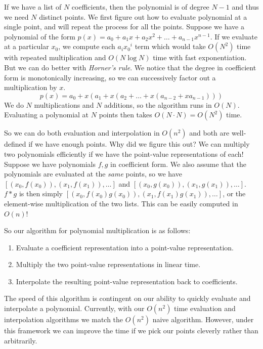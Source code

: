 \documentclass[11pt, oneside]{article}
\theoremstyle{plain}
\theoremstyle{definition}
\begin{document}
If we have a list of \( N \) coefficients, then the polynomial is of degree
\( N - 1 \) and thus we need \( N \) distinct points.
We first figure out how to evaluate polynomial at a single point,
and will repeat the process for all the points.
Suppose we have a polynomial of the form
\( p(x) = a_0 + a_1 x + a_2 x^2 + \dots + a_{n - 1} x^{n - 1} \). 
If we evaluate at a particular \( x_0 \), we compute each \( a_i {x_0}^i \) term
which would take \( O(N^2) \) time with repeated multiplication
and \( O(N \log N) \) time with fast exponentiation. 
But we can do better with \textit{Horner's rule}.
We notice that the degree in coefficient form is monotonically increasing,
so we can successively factor out a multiplication by \( x \).
\[ p(x) = a_0 + x (a_1 + x(a_2 + \dots + x(a_{n - 2} + x a_{n - 1}))) \] 
We do \( N \) multiplications and \( N \) additions, so the algorithm runs in
\( O(N) \). Evaluating a polynomial at \( N \) points then takes
\( O(N \cdot N) = O(N^2) \) time.

So we can do both evaluation and interpolation in \( O(n^2) \) and both are
well-defined if we have enough points. Why did we figure this out?
We can multiply two polynomials efficiently if we have the point-value
representations of each! Suppose we have polynomials \( f, g \) in
coefficient form. We also assume that the polynomials are evaluated at the
\textit{same} points, so we have \( [(x_0, f(x_0)), (x_1, f(x_1)), \dots ]\)
and \( [(x_0, g(x_0)), (x_1, g(x_1)), \dots ]\). \( f * g \) is then simply
\( [(x_0, f(x_0) g(x_0)), (x_1, f(x_1) g(x_1)), \dots] \), or the element-wise
multiplication of the two lists. This can be easily computed in \( O(n) \)!

So our algorithm for polynomial multiplication is as follows:
\begin{enumerate}
    \item Evaluate a coefficient representation into a point-value representation.
    \item Multiply the two point-value representations in linear time.
    \item Interpolate the resulting point-value
representation back to coefficients.
\end{enumerate}

The speed of this algorithm is contingent on our ability to quickly
evaluate and interpolate a polynomial. Currently, with our \( O(n^2) \) time
evaluation and interpolation algorithms we match the \( O(n^2) \) naive
algorithm. However, under this framework we can improve the time if we pick
our points cleverly rather than arbitrarily.
\end{document}
